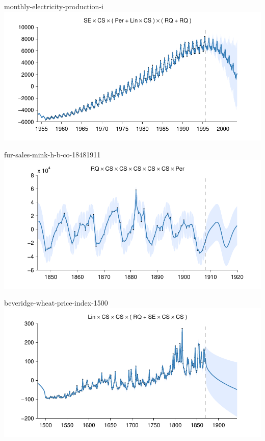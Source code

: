 \begin{frame}{monthly-electricity-production-i}
  \center
  \includegraphics[width=1.0\textwidth]{figures/monthly-electricity-production-i/monthly-electricity-production-i_all}
\end{frame}  

\begin{frame}{fur-sales-mink-h-b-co-18481911}
  \center
  \includegraphics[width=1.0\textwidth]{figures/fur-sales-mink-h-b-co-18481911/fur-sales-mink-h-b-co-18481911_all}
\end{frame}  
    
\begin{frame}{beveridge-wheat-price-index-1500}
  \center
  \includegraphics[width=1.0\textwidth]{figures/beveridge-wheat-price-index-1500/beveridge-wheat-price-index-1500_all}
\end{frame}
    
